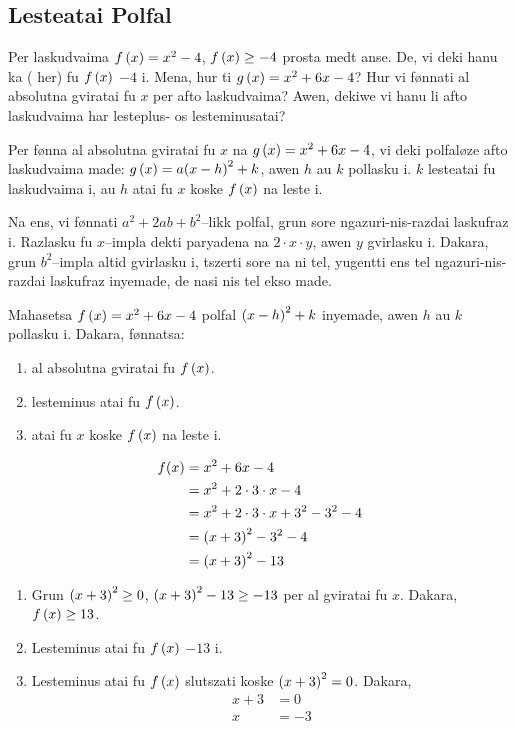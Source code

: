 \subsection{Lesteatai Polfal}
Per laskudvaima \(f \left(x\right) = x^2 - 4\), \(f\left(x\right) \geq - 4\) prosta medt anse. De, vi deki hanu
ka  ( her) fu \(f\left(x\right)\) \(-4\) i. Mena, hur ti
\(g \left(x\right) = x^2+6x-4\)? Hur vi fønnati al absolutna gviratai fu \(x\) per afto laskudvaima?
Awen, dekiwe vi hanu li afto laskudvaima har lesteplus- os lesteminusatai?

Per fønna al absolutna gviratai fu \(x\) na \(g \left(x\right)=x^2+6x-4\), vi deki polfaløze afto
laskudvaima  made: \(g \left(x\right) = a{\left(x-h\right)}^2+k\), awen
\(h\) au \(k\) pollasku i. \(k\) lesteatai fu laskudvaima i, au \(h\) atai fu \(x\) koske \(f \left(x\right)\)
na leste i.

Na ens, vi fønnati \(a^2 + 2ab + b^2\)--likk polfal, grun sore ngazuri-nis-razdai laskufraz i.
Razlasku fu \(x\)--impla dekti paryadena na \(2 \cdot x \cdot y\), awen \(y\) gvirlasku i.
Dakara, grun \(b^2\)--impla altid gvirlasku i, tszerti sore na ni tel, yugentti ens tel ngazuri-nis-razdai
laskufraz inyemade, de nasi nis tel ekso made.

\begin{tatoeba}
  Mahasetsa \(f \left(x\right)=x^2+6x-4\) polfal \({\left(x-h\right)}^2+k\) inyemade,
  awen \(h\) au \(k\) pollasku i. Dakara, fønnatsa:
  \begin{enumerate}
    \item al absolutna gviratai fu \(f \left(x\right)\).
    \item lesteminus atai fu \(f \left(x\right)\).
    \item atai fu \(x\) koske \(f \left(x\right)\) na leste i.
  \end{enumerate}
\end{tatoeba}

\begin{svarna}
  \begin{align*}
    f(x) &= x^2 + 6x - 4 \\
    &= x^2 + 2 \cdot 3 \cdot x - 4 \\
    &= x^2 + 2 \cdot 3 \cdot x + 3^2 - 3^2 - 4 \\
    &= {\left(x+3\right)}^2 - 3^2 - 4 \\
    &= {\left(x+3\right)}^2 - 13 \\
  \end{align*}
  \begin{enumerate}
    \item Grun \({\left(x+3\right)}^2\geq0\), \({\left(x+3\right)}^2-13\geq-13\) per al gviratai fu \(x\). Dakara, \(f \left(x\right)\geq13\).
    \item Lesteminus atai fu \(f \left(x\right)\) \(-13\) i.
    \item Lesteminus atai fu \(f \left(x\right)\) slutszati koske \({\left(x+3\right)}^2=0\). Dakara,
  \begin{align*}
    x + 3 &= 0 \\
    x &= -3
  \end{align*}
  \end{enumerate}
\end{svarna}

